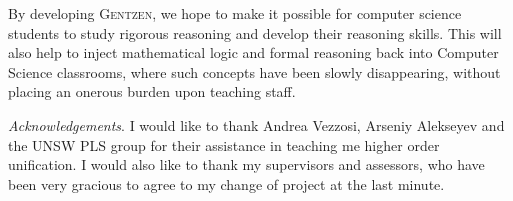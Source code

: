 \documentclass[a4paper]{jfp}
\begin{document}
By developing \textsc{Gentzen}, we hope to make it possible for computer science students to study rigorous reasoning and develop their reasoning skills. This will also help to inject mathematical logic and formal reasoning back into Computer Science classrooms, where such concepts have been slowly disappearing, without placing an onerous burden upon teaching staff.

\bigskip

\bigskip

\bigskip

\emph{Acknowledgements}. I would like to thank Andrea Vezzosi, Arseniy Alekseyev and the UNSW PLS group for their assistance in teaching me higher order unification. I would also like to thank my supervisors and assessors, who have been very gracious to agree to my change of project at the last minute.

\bigskip



\end{document}
